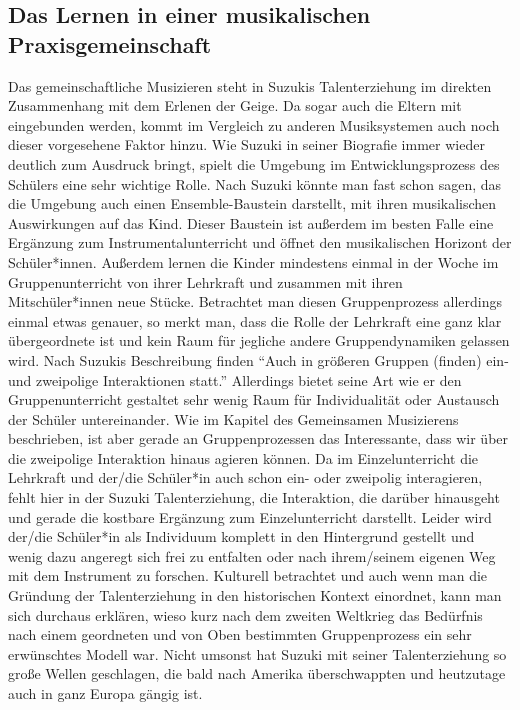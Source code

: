 \subsection{Das Lernen in einer musikalischen Praxisgemeinschaft}

Das gemeinschaftliche Musizieren steht in Suzukis Talenterziehung im direkten
Zusammenhang mit dem Erlenen der Geige. Da sogar auch die Eltern mit eingebunden
werden, kommt im Vergleich zu anderen Musiksystemen auch noch dieser vorgesehene
Faktor hinzu. Wie Suzuki in seiner Biografie immer wieder deutlich zum Ausdruck
bringt, spielt die Umgebung im Entwicklungsprozess des Schülers eine sehr
wichtige Rolle. Nach Suzuki könnte man fast schon sagen, das die Umgebung auch
einen Ensemble-Baustein darstellt, mit ihren musikalischen Auswirkungen auf das
Kind. Dieser Baustein ist außerdem im besten Falle eine Ergänzung zum
Instrumentalunterricht und öffnet den musikalischen Horizont der Schüler*innen.
Außerdem lernen die Kinder mindestens einmal in der Woche im Gruppenunterricht
von ihrer Lehrkraft und zusammen mit ihren Mitschüler*innen neue Stücke.
Betrachtet man diesen Gruppenprozess allerdings einmal etwas genauer, so merkt
man, dass die Rolle der Lehrkraft eine ganz klar übergeordnete ist und kein Raum
für jegliche andere Gruppendynamiken gelassen wird. Nach Suzukis Beschreibung
finden \enquote{Auch in größeren Gruppen (finden) ein- und zweipolige
Interaktionen statt.} \autocite[30]{suzuki:erziehung_ist_liebe} Allerdings
bietet seine Art wie er den Gruppenunterricht gestaltet sehr wenig Raum für
Individualität oder Austausch der Schüler untereinander. Wie im Kapitel des
Gemeinsamen Musizierens beschrieben, ist aber gerade an Gruppenprozessen das
Interessante, dass wir über die zweipolige Interaktion hinaus agieren können. Da
im Einzelunterricht die Lehrkraft und der/die Schüler*in auch schon ein- oder
zweipolig interagieren, fehlt hier in der Suzuki Talenterziehung, die
Interaktion, die darüber hinausgeht und gerade die kostbare Ergänzung zum
Einzelunterricht darstellt. Leider wird der/die Schüler*in als Individuum
komplett in den Hintergrund gestellt und wenig dazu angeregt sich frei zu
entfalten oder nach ihrem/seinem eigenen Weg mit dem Instrument zu forschen.
Kulturell betrachtet und auch wenn man die Gründung der Talenterziehung in den
historischen Kontext einordnet, kann man sich durchaus erklären, wieso kurz nach
dem zweiten Weltkrieg das Bedürfnis nach einem geordneten und von Oben
bestimmten Gruppenprozess ein sehr erwünschtes Modell war. Nicht umsonst hat
Suzuki mit seiner Talenterziehung so große Wellen geschlagen, die bald nach
Amerika überschwappten und heutzutage auch in ganz Europa gängig ist.



